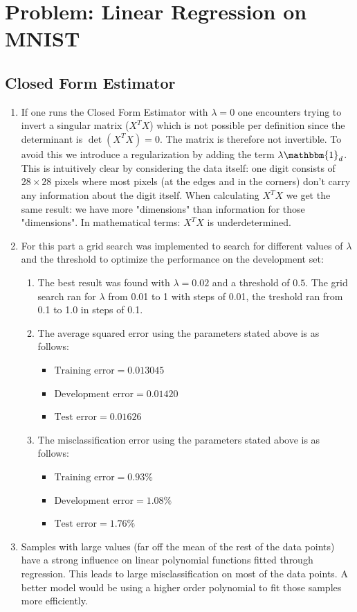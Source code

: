\documentclass[12pt]{article}
\begin{document}
\section{Problem: Linear Regression on MNIST}

\subsection{Closed Form Estimator}

\begin{enumerate}
	\item If one runs the Closed Form Estimator with $\lambda = 0$ one encounters trying to invert a singular matrix ($X^TX$) which is not possible per definition since the determinant is $\det(X^TX)=0$. The matrix is therefore not invertible. To avoid this we introduce a regularization by adding the term $\lambda\mathbbm{1}_d$. This is intuitively clear by considering the data itself: one digit consists of $28\times 28$ pixels where most pixels (at the edges and in the corners) don't carry any information about the digit itself. When calculating $X^TX$ we get the same result: we have more "dimensions" than information for those "dimensions". In mathematical terms: $X^TX$ is underdetermined.
	\item For this part a grid search was implemented to search for different values of $\lambda$ and the threshold to optimize the performance on the development set:
		\begin{enumerate}[label=(\alph*)]
			\item The best result was found with $\lambda=0.02$ and a threshold of $0.5$. The grid search ran for $\lambda$ from 0.01 to 1 with steps of 0.01, the treshold ran from 0.1 to 1.0 in steps of 0.1.
			\item The average squared error using the parameters stated above is as follows:
				\begin{itemize}
					\item $\text{Training error}=0.013045$
					\item $\text{Development error}=0.01420$
					\item $\text{Test error}=0.01626$
				\end{itemize}
			\item The misclassification error using the parameters stated above is as follows:
			\begin{itemize}
				\item $\text{Training error}=0.93\%$
				\item $\text{Development error}=1.08\%$
				\item $\text{Test error}=1.76\%$
			\end{itemize}
		\end{enumerate}
	\item Samples with large values (far off the mean of the rest of the data points) have a strong influence on linear polynomial functions fitted through regression. This leads to large misclassification on most of the data points. A better model would be using a higher order polynomial to fit those samples more efficiently.
\end{enumerate}
\end{document}
